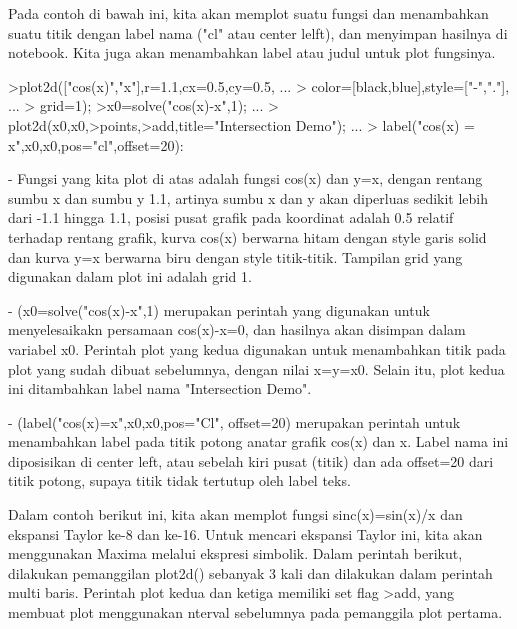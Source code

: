 \documentclass[a4paper,10pt]{article}
\begin{document}
\begin{eulernotebook}
\begin{eulercomment}
\begin{eulercomment}
\begin{eulercomment}
\begin{eulercomment}
\begin{eulercomment}
Pada contoh di bawah ini, kita akan memplot suatu fungsi dan
menambahkan suatu titik dengan label nama ("cl" atau center lelft),
dan menyimpan hasilnya di notebook. Kita juga akan menambahkan label
atau judul untuk plot fungsinya.
\end{eulercomment}
\begin{eulerprompt}
>plot2d(["cos(x)","x"],r=1.1,cx=0.5,cy=0.5, ...
>  color=[black,blue],style=["-","."], ...
>  grid=1);
>x0=solve("cos(x)-x",1);  ...
>  plot2d(x0,x0,>points,>add,title="Intersection Demo");  ...
>  label("cos(x) = x",x0,x0,pos="cl",offset=20):
\end{eulerprompt}
\begin{eulercomment}
- Fungsi yang kita plot di atas adalah fungsi cos(x) dan y=x, dengan
rentang sumbu x dan sumbu y 1.1, artinya sumbu x dan y akan diperluas
sedikit lebih dari -1.1 hingga 1.1, posisi pusat grafik pada koordinat
adalah 0.5 relatif terhadap rentang grafik, kurva cos(x) berwarna
hitam dengan style garis solid dan kurva y=x berwarna biru dengan
style titik-titik. Tampilan grid yang digunakan dalam plot ini adalah
grid 1.

- (x0=solve("cos(x)-x",1) merupakan perintah yang digunakan untuk
menyelesaikakn persamaan cos(x)-x=0, dan hasilnya akan disimpan dalam
variabel x0. Perintah plot yang kedua digunakan untuk menambahkan
titik pada plot yang sudah dibuat sebelumnya, dengan nilai x=y=x0.
Selain itu, plot kedua ini ditambahkan label nama "Intersection Demo".

- (label("cos(x)=x",x0,x0,pos="Cl", offset=20) merupakan perintah
untuk menambahkan label pada titik potong anatar grafik cos(x) dan x.
Label nama ini diposisikan di center left, atau sebelah kiri pusat
(titik) dan ada offset=20 dari titik potong, supaya titik tidak
tertutup oleh label teks.

Dalam contoh berikut ini, kita akan memplot fungsi sinc(x)=sin(x)/x
dan ekspansi Taylor ke-8 dan ke-16. Untuk mencari ekspansi Taylor ini,
kita akan menggunakan Maxima melalui ekspresi simbolik. Dalam perintah
berikut, dilakukan pemanggilan plot2d() sebanyak 3 kali dan dilakukan
dalam perintah multi baris. Perintah plot kedua dan ketiga memiliki
set flag \textgreater{}add, yang membuat plot menggunakan nterval sebelumnya pada
pemanggila plot pertama.


\end{eulercomment}
\end{eulercomment}
\end{eulercomment}
\end{eulercomment}
\end{eulercomment}
\end{eulernotebook}
\end{document}
